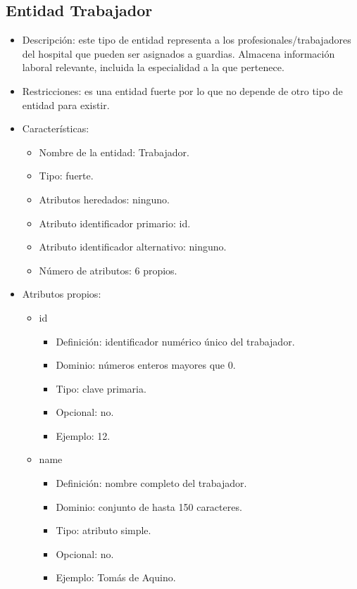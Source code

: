 \subsection{Entidad Trabajador}
\begin{itemize}
    \item Descripción: este tipo de entidad representa a los profesionales/trabajadores del hospital que pueden ser asignados a guardias. Almacena información laboral relevante, incluida la especialidad a la que pertenece.
    \item Restricciones: es una entidad fuerte por lo que no depende de otro tipo de entidad para existir.
    \item Características:
    \begin{itemize}
        \item Nombre de la entidad: Trabajador.
        \item Tipo: fuerte.
        \item Atributos heredados: ninguno.
        \item Atributo identificador primario: id.
        \item Atributo identificador alternativo: ninguno.
        \item Número de atributos: 6 propios.
    \end{itemize}

    \item Atributos propios:
    \begin{itemize}
        \item id
        \begin{itemize}
            \item Definición: identificador numérico único del trabajador.
            \item Dominio: números enteros mayores que 0.
            \item Tipo: clave primaria.
            \item Opcional: no.
            \item Ejemplo: 12.
        \end{itemize}

        \item name
        \begin{itemize}
            \item Definición: nombre completo del trabajador.
            \item Dominio: conjunto de hasta 150 caracteres.
            \item Tipo: atributo simple.
            \item Opcional: no.
            \item Ejemplo: Tomás de Aquino.
        \end{itemize}


\end{itemize}
\end{itemize}
